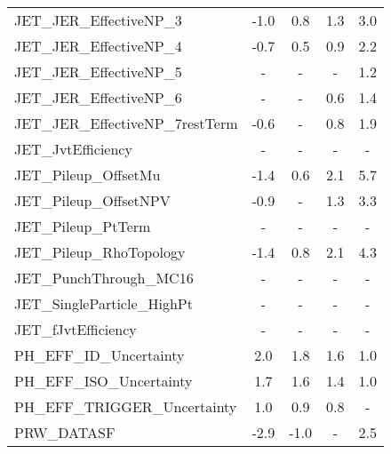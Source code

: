 \begin{table}[htbp]
{\begin{tabular}{l | cccc}
JET\_JER\_EffectiveNP\_3                     &  -1.0 &   0.8 &   1.3 &   3.0 \\
JET\_JER\_EffectiveNP\_4                     &  -0.7 &   0.5 &   0.9 &   2.2 \\
JET\_JER\_EffectiveNP\_5                     &     - &     - &     - &   1.2 \\
JET\_JER\_EffectiveNP\_6                     &     - &     - &   0.6 &   1.4 \\
JET\_JER\_EffectiveNP\_7restTerm             &  -0.6 &     - &   0.8 &   1.9 \\
JET\_JvtEfficiency                         &     - &     - &     - &     - \\
JET\_Pileup\_OffsetMu                       &  -1.4 &   0.6 &   2.1 &   5.7 \\
JET\_Pileup\_OffsetNPV                      &  -0.9 &     - &   1.3 &   3.3 \\
JET\_Pileup\_PtTerm                         &     - &     - &     - &     - \\
JET\_Pileup\_RhoTopology                    &  -1.4 &   0.8 &   2.1 &   4.3 \\
JET\_PunchThrough\_MC16                     &     - &     - &     - &     - \\
JET\_SingleParticle\_HighPt                 &     - &     - &     - &     - \\
JET\_fJvtEfficiency                        &     - &     - &     - &     - \\
PH\_EFF\_ID\_Uncertainty                     &   2.0 &   1.8 &   1.6 &   1.0 \\
PH\_EFF\_ISO\_Uncertainty                    &   1.7 &   1.6 &   1.4 &   1.0 \\
PH\_EFF\_TRIGGER\_Uncertainty                &   1.0 &   0.9 &   0.8 &     - \\
PRW\_DATASF                                &  -2.9 &  -1.0 &     - &   2.5 \\
\end{tabular}

}
\end{table}

